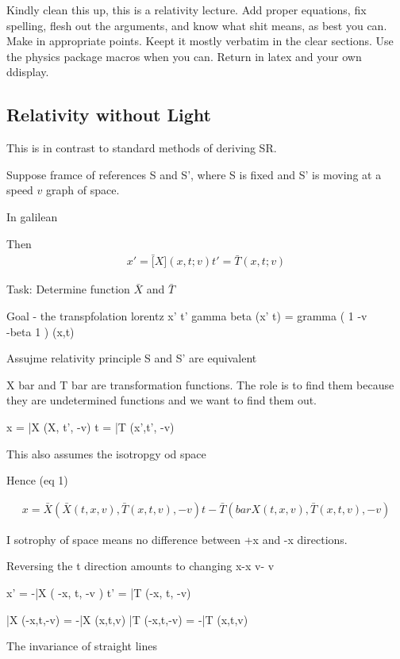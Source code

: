 Kindly clean this up, this is a relativity lecture. Add proper equations, fix spelling, flesh out the arguments, and know what shit means, as best you can. Make \subsubsections in appropriate points.
Keept it mostly verbatim in the clear sections.
Use the physics package macros when you can. Return in latex and your own ddisplay. 

\subsection{Relativity without Light}

This is in contrast to standard methods of deriving SR.

Suppose framce of references S and S', where S is fixed and S' is moving at a speed $v$
graph of space.

In galilean 

Then
\begin{align*}
	x' = \bar[X](x,t;v)
	t' = \bar{T}(x,t;v)
\end{align*}

Task: Determine function $\bar X$ and $\bar T$

Goal - the transpfolation lorentz 
x' 
t' 
gamma 
beta
(x' t) = gramma ( 1 -v \\ -beta 1 ) (x,t)


Assujme relativity principle
S and S' are equivalent

X bar and T bar are transformation functions. The role is to find them because they are undetermined functions and we want to find them out.

x = \bar{X} (X, t', -v)
t = \bar T (x',t', -v)

This also assumes the isotropgy od space

Hence (eq 1)

\begin{align}
	x = \bar X ( \bar X(t,x,v), \bar{T}(x,t,v),-v )
	t - \bar T ( bar X(t,x,v), \bar{T}(x,t,v), - v )
\end{align}

I sotrophy of space means no difference between +x and -x directions.

Reversing the t direction amounts to changing 
x\to-x 
v\to - v

x' = -\bar X ( -x, t, -v )
t' = \bar T (-x, t, -v)

\bar X (-x,t,-v) = -\bar X (x,t,v)
\bar T (-x,t,-v) = -\bar T (x,t,v)

The invariance of straight lines

